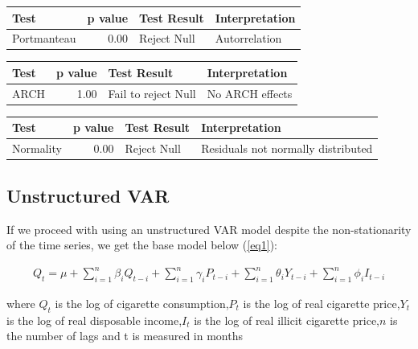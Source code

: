 \documentclass[11pt,preprint, authoryear]{elsarticle}
\let\origtable\table
\let\endorigtable\endtable
\renewenvironment{table}[1][2] {
    \expandafter\origtable\expandafter[H]
} {
    \endorigtable
}
\numberwithin{equation}{section}
\numberwithin{figure}{section}
\numberwithin{table}{section}
\begin{document}
\begin{table}[H]
\centering
\begin{tabular}{lrll}
  \hline
Test & p value & Test Result & Interpretation \\ 
  \hline
Portmanteau & 0.00 & Reject Null & Autorrelation \\ 
   \hline
\end{tabular}
\caption{Serial Correlcation Test \label{diag}} 
\end{table}
\begin{table}[H]
\centering
\begin{tabular}{lrll}
  \hline
Test & p value & Test Result & Interpretation \\ 
  \hline
ARCH & 1.00 & Fail to reject Null & No ARCH effects \\ 
   \hline
\end{tabular}
\caption{ARCH Tests \label{archh}} 
\end{table}
\begin{table}[H]
\centering
\begin{tabular}{lrll}
  \hline
Test & p value & Test Result & Interpretation \\ 
  \hline
Normality & 0.00 & Reject Null & Residuals not normally distributed \\ 
   \hline
\end{tabular}
\caption{Normality Tests \label{archh}} 
\end{table}

\hypertarget{unstructured-var}{%
\subsection{Unstructured VAR}\label{unstructured-var}}

If we proceed with using an unstructured VAR model despite the
non-stationarity of the time series, we get the base model below
(\ref{eq1}):

\begin{align}
 Q_t = \mu + \sum_{i = 1}^{n}\beta_iQ_{t-i} +\sum_{i = 1}^{n}\gamma_iP_{t-i} + \sum_{i = 1}^{n}\theta_iY_{t-i} + \sum_{i = 1}^{n}\phi_iI_{t-i} \label{eq1}
\end{align}

where \(Q_t\) is the log of cigarette consumption,\newline \(P_{t}\) is
the log of real cigarette price,\newline \(Y_{t}\) is the log of real
disposable income,\newline \(I_{t}\) is the log of real illicit
cigarette price,\newline \(n\) is the number of lags and t is measured
in months
\end{document}
